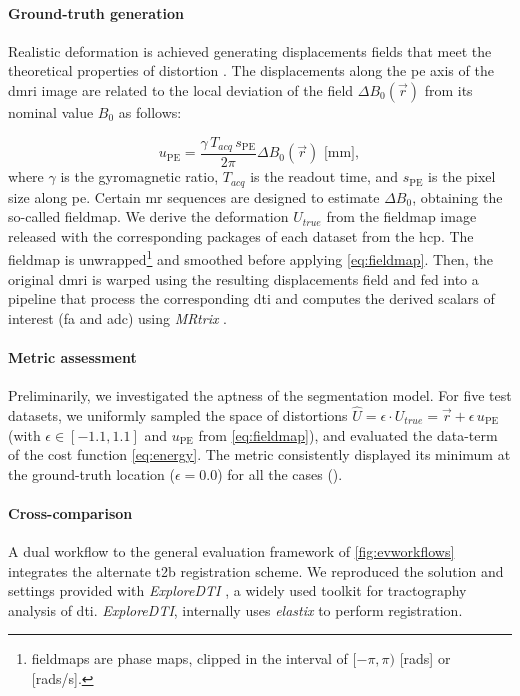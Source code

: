 \paragraph*{Ground-truth generation}
Realistic deformation is achieved generating displacements fields that meet the theoretical
  properties of distortion \citep{jezzard_correction_1995}.
The displacements along the \gls*{pe} axis of the \gls*{dmri} image are related to the local
  deviation of the field $\Delta B_0(\vec{r})$ from its nominal value $B_0$ as follows:

  \begin{equation}
  u_\text{PE} = \frac{\gamma \, T_{acq}\, s_\text{PE}}{2\pi}\Delta B_0(\vec{r})\text{ [mm]},
  \label{eq:fieldmap}
  \end{equation}
%
where $\gamma$ is the gyromagnetic ratio, $T_{acq}$ is the readout time, and
  $s_\text{PE}$ is the pixel size along \gls*{pe}.
Certain \gls*{mr} sequences are designed to estimate $\Delta B_0$, obtaining
  the so-called fieldmap.
We derive the deformation $U_{true}$ from the fieldmap image released with
  the corresponding packages of each dataset from the \gls*{hcp}.
The fieldmap is unwrapped\footnote{fieldmaps are phase maps, clipped in the interval
  of $[-\pi, \pi)$ [rads] or [rads/s].} and smoothed before applying \eqref{eq:fieldmap}.
Then, the original \gls*{dmri} is warped using the resulting displacements field and fed into
  a pipeline that process the corresponding \gls*{dti} and computes the derived scalars of
  interest (\gls*{fa} and \gls*{adc}) using \emph{MRtrix} \citep{tournier_mrtrix_2012}.

\paragraph*{Metric assessment}
Preliminarily, we investigated the aptness of the segmentation model.
For five test datasets, we uniformly sampled the space of distortions
  $\hat{U} = \epsilon \cdot U_{true} = \vec{r} + \epsilon \, u_\text{PE}$
  (with $\epsilon \in [-1.1, 1.1]$ and $u_\text{PE}$ from \eqref{eq:fieldmap}),
  and evaluated the data-term of the cost function \eqref{eq:energy}.
The metric consistently displayed its minimum at the ground-truth location ($\epsilon=0.0$)
  for all the cases ().

\paragraph*{Cross-comparison}
A dual workflow to the general evaluation framework of \autoref{fig:evworkflows}
  integrates the alternate \gls*{t2b} registration scheme.
We reproduced the solution and settings provided with \emph{ExploreDTI}
  \citep{leemans_exploredti_2009}, a widely used toolkit for tractography analysis of
  \gls*{dti}.
\emph{ExploreDTI}, internally uses \emph{elastix} \citep{klein_elastix_2010} to
  perform registration.

